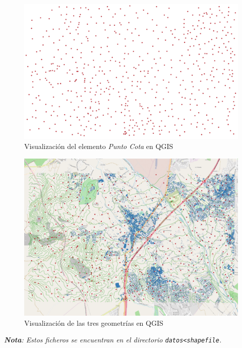 \begin{enumerate}
	\begin{figure}[H]
		\centering
		\includegraphics[width=0.95\linewidth]{imagenes/capitulo5/puntocota}
		\caption{Visualización del elemento \textit{Punto Cota} en QGIS}
		\label{fig:puntocota}
	\end{figure}
\end{enumerate}

\begin{figure}[H]
	\centering
	\includegraphics[width=1\linewidth]{imagenes/capitulo5/mapa}
	\caption{Visualización de las tres geometrías en QGIS}
	\label{fig:mapa}
\end{figure}

\textit{\textbf{Nota}: Estos ficheros se encuentran en el directorio \texttt{datos<shapefile}.}

